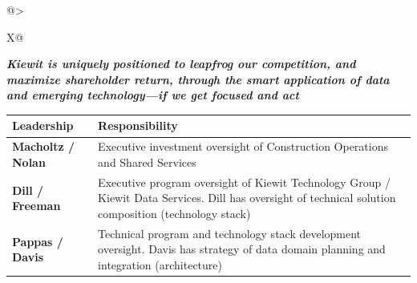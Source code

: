 \documentclass[12pt, a4paper]{article}
\begin{document}
{\begin{tabularx}{\textwidth}{@{}>{\raggedright\arraybackslash}X@{}}

\vspace{0.3em}

\textbf{\textit{Kiewit is uniquely positioned to leapfrog our competition, and maximize shareholder return, through the smart application of data and emerging technology—if we get focused and act}} \\
\end{tabularx}
}

\vspace{0.4em}

{\footnotesize
{}

\vspace{0.05em}

 \renewcommand{\arraystretch}{1.05}
 \begin{tabularx}{\textwidth}{@{}
 >{\raggedright\arraybackslash}p{4.5cm}
 >{\raggedright\arraybackslash}X@{}}
 \textbf{Leadership} & \textbf{Responsibility} \\
 \midrule
 \textbf{Macholtz / Nolan} & 
 Executive investment oversight of Construction Operations and Shared Services \\
 \midrule
 \textbf{Dill / Freeman} & 
 Executive program oversight of Kiewit Technology Group / Kiewit Data Services. Dill has oversight of technical solution composition (technology stack) \\
 \midrule
 \textbf{Pappas / Davis} & 
 Technical program and technology stack development oversight. Davis has strategy of data domain planning and integration (architecture) \\
 \bottomrule
 \end{tabularx}
 \renewcommand{\arraystretch}{1.0}
 }
\end{document}
